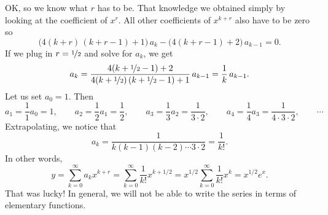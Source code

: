 \documentclass{ximera}
\begin{document}
\begin{exampleSol}
    OK\@, so we know what $r$ has to be.  That knowledge we obtained simply by looking at the coefficient of $x^r$.  All other coefficients of $x^{k+r}$ also have to be zero so
    \begin{equation*}
        \bigl( 4 (k+r)\,(k+r-1) + 1 \bigr) \, a_k - \bigl( 4 (k+r-1) + 2 \bigr) \, a_{k-1} = 0 .
    \end{equation*}
    If we plug in $r=\nicefrac{1}{2}$ and solve for $a_k$, we get
    \begin{equation*}
        a_k = \frac{4 (k+\nicefrac{1}{2}-1) + 2}{4 (k+\nicefrac{1}{2})\,(k+\nicefrac{1}{2}-1) + 1} \, a_{k-1} = \frac{1}{k} \, a_{k-1} .
    \end{equation*}
    Let us set $a_0 = 1$.  Then
    \begin{equation*}
        a_1 = \frac{1}{1} a_0 = 1 , \qquad a_2 = \frac{1}{2} a_1 = \frac{1}{2} , \qquad a_3 = \frac{1}{3} a_2 = \frac{1}{3 \cdot 2} , \qquad a_4 = \frac{1}{4} a_3 = \frac{1}{4 \cdot 3 \cdot 2} , \qquad \cdots
    \end{equation*}
    Extrapolating, we notice that
    \begin{equation*}
        a_k = \frac{1}{k(k-1)(k-2) \cdots 3 \cdot 2} = \frac{1}{k!} .
    \end{equation*}
    In other words,
    \begin{equation*}
        y =  \sum_{k=0}^\infty a_k x^{k+r} = \sum_{k=0}^\infty \frac{1}{k!} x^{k+1/2} = x^{1/2} \sum_{k=0}^\infty \frac{1}{k!} x^{k} = x^{1/2} e^x .
    \end{equation*}
    That was lucky!  In general, we will not be able to write the series in terms of elementary functions.
    

\end{exampleSol}
\end{document}
